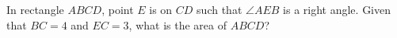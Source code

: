 In rectangle $ABCD$, point $E$ is on $CD$ such that $\angle AEB$ is a right angle. Given that $BC = 4$ and $EC = 3$, what is the area of $ABCD$?
